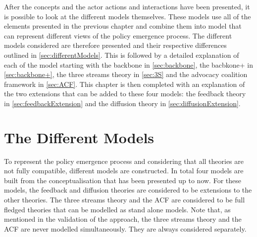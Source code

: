 After the concepts and the actor actions and interactions have been presented, it is possible to look at the different models themselves. These models use all of the elements presented in the previous chapter and combine them into model that can represent different views of the policy emergence process. The different models considered are therefore presented and their respective differences outlined in \autoref{sec:differentModels}. This is followed by a detailed explanation of each of the model starting with the backbone in \autoref{sec:backbone}, the bacbkone+ in \autoref{sec:backbone+}, the three streams theory in \autoref{sec:3S} and the advocacy coalition framework in \autoref{sec:ACF}. This chapter is then completed with an explanation of the two extensions that can be added to these four models: the feedback theory in \autoref{sec:feedbackExtension} and the diffusion theory in \autoref{sec:diffusionExtension}.


%
\section{The Different Models}
\label{sec:differentModels}

To represent the policy emergence process and considering that all theories are not fully compatible, different models are constructed. In total four models are built from the conceptualisation that has been presented up to now. For these models, the feedback and diffusion theories are considered to be extensions to the other theories. The three streams theory and the ACF are considered to be full fledged theories that can be modelled as stand alone models. Note that, as mentioned in the validation of the approach, the three streams theory and the ACF are never modelled simultaneously. They are always considered separately.

